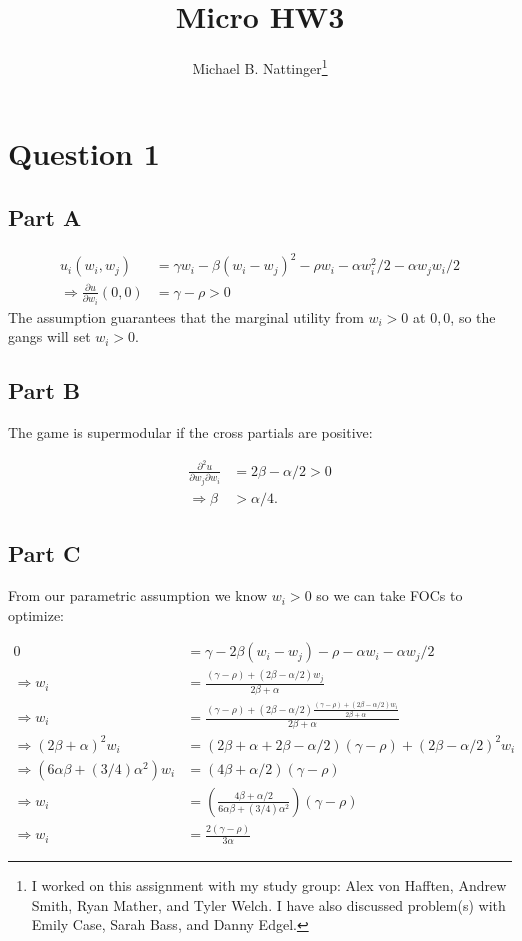 \documentclass[11pt]{article} %
\title{Micro HW3}
\author{Michael B. Nattinger\footnote{I worked on this assignment with my study group: Alex von Hafften, Andrew Smith, Ryan Mather, and Tyler Welch. I have also discussed problem(s) with Emily Case, Sarah Bass, and Danny Edgel.}}
\begin{document}
\maketitle

\section{Question 1}
\subsection{Part A}
\begin{align*}
u_i(w_i,w_j) &= \gamma w_i - \beta(w_i - w_j)^2 - \rho w_i - \alpha w_i^2/2 - \alpha w_jw_i/2\\
\Rightarrow \frac{\partial u}{\partial w_i}(0,0) &= \gamma-\rho>0 
\end{align*}
The assumption guarantees that the marginal utility from $w_i>0$ at $0,0$, so the gangs will set $w_i>0$.
\subsection{Part B}
The game is supermodular if the cross partials are positive:

\begin{align*}
\frac{\partial^2 u}{\partial w_j \partial w_i} &= 2\beta - \alpha/2 >0 \\
\Rightarrow \beta&>\alpha/4.
\end{align*}
\subsection{Part C}
From our parametric assumption we know $w_i>0$ so we can take FOCs to optimize:

\begin{align*}
0 &= \gamma - 2\beta (w_i - w_j) - \rho -\alpha w_i - \alpha w_j/2\\
\Rightarrow w_i &= \frac{(\gamma-\rho) + (2\beta -\alpha/2)w_j }{2\beta +\alpha}\\
\Rightarrow w_i &= \frac{(\gamma-\rho) + (2\beta -\alpha/2)\frac{(\gamma-\rho) + (2\beta -\alpha/2)w_i }{2\beta +\alpha} }{2\beta +\alpha}\\
\Rightarrow (2\beta + \alpha)^2 w_i &= (2\beta+\alpha + 2\beta - \alpha/2)(\gamma - \rho) + (2\beta - \alpha/2)^2 w_i\\
\Rightarrow (6\alpha\beta + (3/4)\alpha^2)w_i &= (4\beta + \alpha/2)(\gamma - \rho)\\
\Rightarrow  w_i &= \left( \frac{4\beta+ \alpha/2}{6\alpha \beta + (3/4)\alpha^2} \right)(\gamma - \rho)\\
\Rightarrow w_i &= \frac{2(\gamma-\rho)}{3\alpha}
\end{align*}
\end{document}
